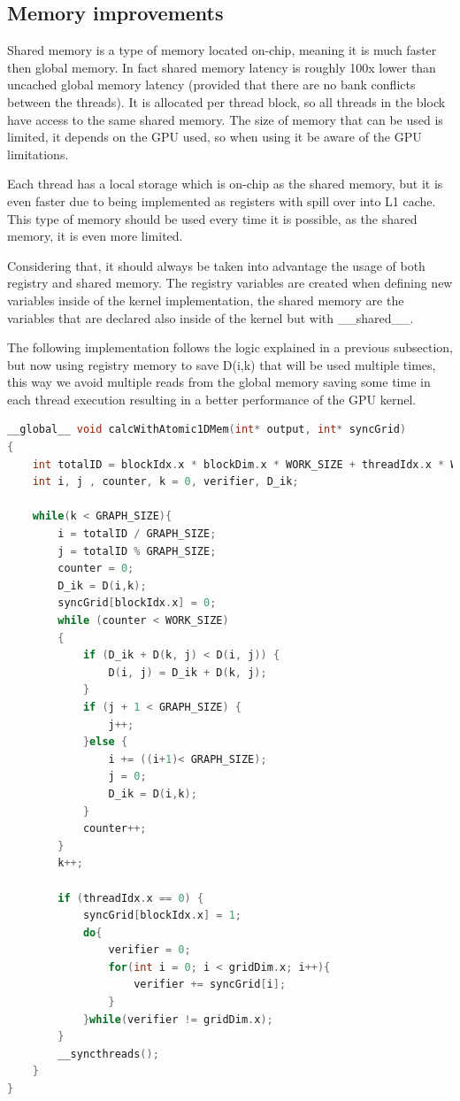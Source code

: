 \documentclass[conference]{IEEEtran}
\begin{document}
\subsection{Memory improvements}
Shared memory is a type of memory located on-chip, meaning it is much faster then global memory. In fact shared memory latency is roughly 
100x lower than uncached global memory latency\cite{memory} (provided that there are no bank conflicts between the threads). It is allocated per 
thread block, so all threads in the block have access to the same shared memory. The size of memory that can be used is limited, it depends on the GPU used, so when using it be aware of the GPU limitations.

Each thread has a local storage which is on-chip as the shared memory, but it is even faster due to being implemented as registers with spill over into L1 cache. This type of memory should be used every time it is possible, as the shared memory, it is even more limited.

Considering that, it should always be taken into advantage the usage of both registry and shared memory. The registry variables are created when defining new variables inside of the kernel implementation, the shared memory are the variables that are declared also inside of the kernel but with \_\_shared\_\_.

The following implementation follows the logic explained in a previous subsection, but now using registry memory to save D(i,k) that will be used multiple times, this way we avoid multiple reads from the global memory saving some time in each thread execution resulting in a better performance of the GPU kernel.


\begin{lstlisting}[language=C++, caption=CUDA implementation with memory improvements]
__global__ void calcWithAtomic1DMem(int* output, int* syncGrid)
{
	int totalID = blockIdx.x * blockDim.x * WORK_SIZE + threadIdx.x * WORK_SIZE;
	int i, j , counter, k = 0, verifier, D_ik;

	while(k < GRAPH_SIZE){
		i = totalID / GRAPH_SIZE;
		j = totalID % GRAPH_SIZE;
		counter = 0;
		D_ik = D(i,k);
		syncGrid[blockIdx.x] = 0;
		while (counter < WORK_SIZE)
		{
			if (D_ik + D(k, j) < D(i, j)) {
				D(i, j) = D_ik + D(k, j);
			}
			if (j + 1 < GRAPH_SIZE) {
				j++;
			}else {
				i += ((i+1)< GRAPH_SIZE);
				j = 0;
				D_ik = D(i,k);
			}
			counter++;
		}
		k++;

		if (threadIdx.x == 0) {
			syncGrid[blockIdx.x] = 1;
			do{
				verifier = 0;
				for(int i = 0; i < gridDim.x; i++){
					verifier += syncGrid[i];
				}
			}while(verifier != gridDim.x);		
		}
		__syncthreads();
	}
}
\end{lstlisting}
\end{document}
